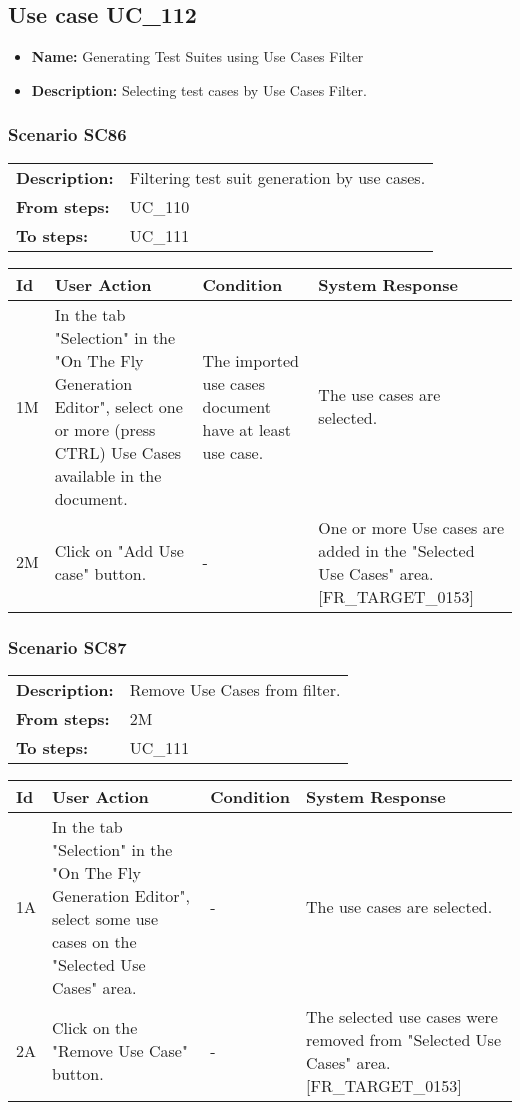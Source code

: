 \documentclass[a4paper,11pt]{article}
\newcommand{\bl}{\\ \hline}
\begin{document}
\subsection*{Use case UC_112}
\begin{itemize}
\item {\bf Name: }Generating Test Suites using Use Cases Filter
\item {\bf Description: }Selecting test cases by Use Cases Filter.
\end{itemize}
\subsubsection*{Scenario SC86}
\begin{tabular}{p{1in}p{4in}}
{\bf Description:} & Filtering test suit generation by use cases.
				 \\
{\bf From steps:} & UC_110#2M \\
{\bf To steps:} & UC_111#2M \\
\end{tabular}
 
\begin{tabular}{|p{0.8in}|p{1.6in}|p{1.6in}|p{1.6in}|}
\hline
Id & User Action & Condition & System Response  \bl 
1M & In the tab "Selection" in the "On The Fly Generation
						Editor", select one or more (press CTRL) Use Cases available in
						the document.  & The imported use cases document have at least use case.
					 & The use cases are selected.  \bl 
2M & Click on "Add Use case" button.  & - & One or more Use cases are added in the "Selected Use
						Cases" area. [FR_TARGET_0153] \bl 
\end{tabular}
\subsubsection*{Scenario SC87}
\begin{tabular}{p{1in}p{4in}}
{\bf Description:} & Remove Use Cases from filter. \\
{\bf From steps:} & 2M \\
{\bf To steps:} & UC_111#2M \\
\end{tabular}
 
\begin{tabular}{|p{0.8in}|p{1.6in}|p{1.6in}|p{1.6in}|}
\hline
Id & User Action & Condition & System Response  \bl 
1A & In the tab "Selection" in the "On The Fly Generation
						Editor", select some use cases on the "Selected Use Cases" area.
					 & - & The use cases are selected. \bl 
2A & Click on the "Remove Use Case" button.  & - & The selected use cases were removed from "Selected Use
						Cases" area. [FR_TARGET_0153] \bl 
\end{tabular}
\end{document}
